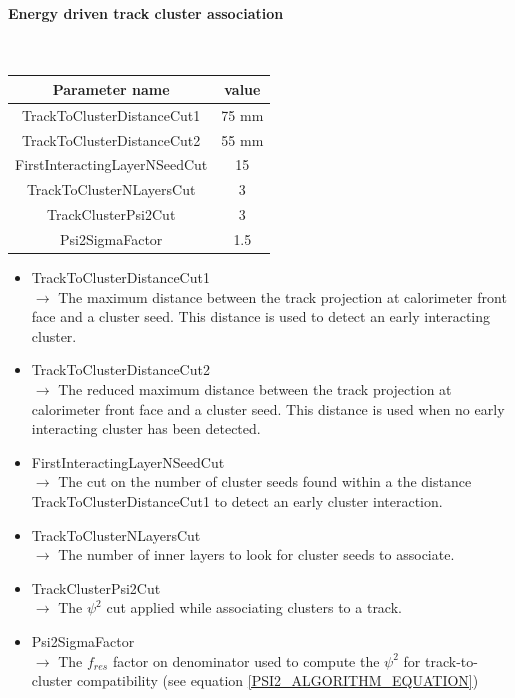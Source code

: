 \documentclass[12pt]{article}
\begin{document}
\paragraph{Energy driven track cluster association} ~

\begin{table}[!ht]
  \begin{center}
    \begin{tabu} to \linewidth { c | c } 
          Parameter name & value \\
          \hline
          TrackToClusterDistanceCut1 & 75 mm \\
          TrackToClusterDistanceCut2 & 55 mm \\
          FirstInteractingLayerNSeedCut & 15 \\
          TrackToClusterNLayersCut & 3 \\
          TrackClusterPsi2Cut & 3 \\
          Psi2SigmaFactor & 1.5
    \end{tabu} 
  \end{center}
\end{table}

\begin{itemize}
  \item TrackToClusterDistanceCut1 \\
  $\rightarrow$ The maximum distance between the track projection at calorimeter front face and a cluster seed. This distance is used to detect an early interacting cluster.
  \item TrackToClusterDistanceCut2 \\
  $\rightarrow$ The reduced maximum distance between the track projection at calorimeter front face and a cluster seed. This distance is used when no early interacting cluster has been detected.
  \item FirstInteractingLayerNSeedCut \\
  $\rightarrow$ The cut on the number of cluster seeds found within a the distance TrackToClusterDistanceCut1 to detect an early cluster interaction.
  \item TrackToClusterNLayersCut \\
  $\rightarrow$ The number of inner layers to look for cluster seeds to associate.
  \item TrackClusterPsi2Cut \\
  $\rightarrow$ The $\psi^2$ cut applied while associating clusters to a track.
  \item Psi2SigmaFactor \\
  $\rightarrow$ The $f_{res}$ factor on denominator used to compute the $\psi^2$ for track-to-cluster compatibility (see equation \ref{PSI2_ALGORITHM_EQUATION})
\end{itemize}
\end{document}
